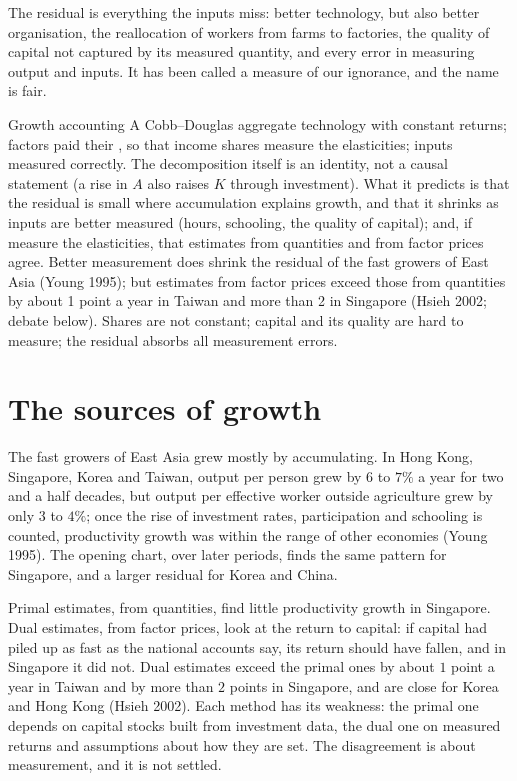The residual is everything the inputs miss: better technology, but also
better organisation, the reallocation of workers from farms to factories,
the quality of capital not captured by its measured quantity, and every
error in measuring output and inputs. It has been called a measure of our
ignorance, and the name is fair.

\begin{model}{Growth accounting}
\assumes A Cobb--Douglas aggregate technology with constant returns;
factors paid their , so that income shares measure the
elasticities; inputs measured correctly.
\predicts The decomposition itself is an identity, not a causal statement
(a rise in $A$ also raises $K$ through investment). What it predicts is that
the residual is small where accumulation explains growth, and that it
shrinks as inputs are better measured (hours, schooling, the quality of
capital); and, if  measure the elasticities, that estimates
from quantities and from factor prices agree.
\tested Better measurement does shrink the residual of the fast growers of
East Asia (Young 1995); %
but estimates from factor prices exceed those from quantities by about 1
point a year in Taiwan and more than 2 in Singapore (Hsieh 2002; debate
below). %
\breaks Shares are not constant; capital and its quality are hard to
measure; the residual absorbs all measurement errors.
\end{model}

\section{The sources of growth}\label{sec:b1:growth-accounting:sources}

The fast growers of East Asia grew mostly by accumulating. In Hong Kong,
Singapore, Korea and Taiwan, output per person grew by $6$ to $7\%$ a year for
two and a half decades, but output per effective worker outside
agriculture grew by only $3$ to $4\%$; once the rise of investment rates,
participation and schooling is counted, productivity growth was within
the range of other economies (Young 1995). %
The opening chart, over later periods, finds the same pattern for
Singapore, and a larger residual for Korea and China.

\begin{debate}
Primal estimates, from quantities, find little productivity growth in
Singapore. Dual estimates, from factor prices, look at the return to
capital: if capital had piled up as fast as the national accounts say, its
return should have fallen, and in Singapore it did not. Dual estimates
exceed the primal ones by about $1$ point a year in Taiwan and by more than $2$
points in Singapore, and are close for Korea and Hong Kong (Hsieh 2002).
Each method has its weakness: the primal one depends on capital stocks
built from investment data, the dual one on measured returns and
assumptions about how they are set. The disagreement is about measurement,
and it is not settled.
\end{debate}

